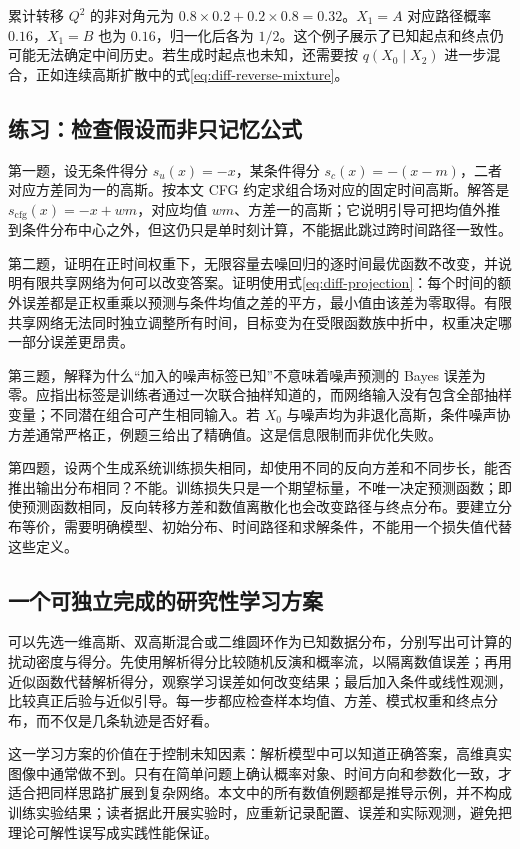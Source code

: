 \documentclass[UTF8,12pt,a4paper,fontset=fandol]{ctexart}
\begin{document}
\begin{solve}
累计转移 $Q^2$ 的非对角元为 $0.8\times0.2+0.2\times0.8=0.32$。$X_1=A$ 对应路径概率 $0.16$，$X_1=B$ 也为 $0.16$，归一化后各为 $1/2$。这个例子展示了已知起点和终点仍可能无法确定中间历史。若生成时起点也未知，还需要按 $q(X_0\mid X_2)$ 进一步混合，正如连续高斯扩散中的式\eqref{eq:diff-reverse-mixture}。
\end{solve}

\subsection{练习：检查假设而非只记忆公式}
第一题，设无条件得分 $s_u(x)=-x$，某条件得分 $s_c(x)=-(x-m)$，二者对应方差同为一的高斯。按本文 CFG 约定求组合场对应的固定时间高斯。解答是 $s_{\mathrm{cfg}}(x)=-x+wm$，对应均值 $wm$、方差一的高斯；它说明引导可把均值外推到条件分布中心之外，但这仍只是单时刻计算，不能据此跳过跨时间路径一致性。

第二题，证明在正时间权重下，无限容量去噪回归的逐时间最优函数不改变，并说明有限共享网络为何可以改变答案。证明使用式\eqref{eq:diff-projection}：每个时间的额外误差都是正权重乘以预测与条件均值之差的平方，最小值由该差为零取得。有限共享网络无法同时独立调整所有时间，目标变为在受限函数族中折中，权重决定哪一部分误差更昂贵。

第三题，解释为什么“加入的噪声标签已知”不意味着噪声预测的 Bayes 误差为零。应指出标签是训练者通过一次联合抽样知道的，而网络输入没有包含全部抽样变量；不同潜在组合可产生相同输入。若 $X_0$ 与噪声均为非退化高斯，条件噪声协方差通常严格正，例题三给出了精确值。这是信息限制而非优化失败。

第四题，设两个生成系统训练损失相同，却使用不同的反向方差和不同步长，能否推出输出分布相同？不能。训练损失只是一个期望标量，不唯一决定预测函数；即使预测函数相同，反向转移方差和数值离散化也会改变路径与终点分布。要建立分布等价，需要明确模型、初始分布、时间路径和求解条件，不能用一个损失值代替这些定义。

\subsection{一个可独立完成的研究性学习方案}
可以先选一维高斯、双高斯混合或二维圆环作为已知数据分布，分别写出可计算的扰动密度与得分。先使用解析得分比较随机反演和概率流，以隔离数值误差；再用近似函数代替解析得分，观察学习误差如何改变结果；最后加入条件或线性观测，比较真正后验与近似引导。每一步都应检查样本均值、方差、模式权重和终点分布，而不仅是几条轨迹是否好看。

这一学习方案的价值在于控制未知因素：解析模型中可以知道正确答案，高维真实图像中通常做不到。只有在简单问题上确认概率对象、时间方向和参数化一致，才适合把同样思路扩展到复杂网络。本文中的所有数值例题都是推导示例，并不构成训练实验结果；读者据此开展实验时，应重新记录配置、误差和实际观测，避免把理论可解性误写成实践性能保证。
\end{document}

